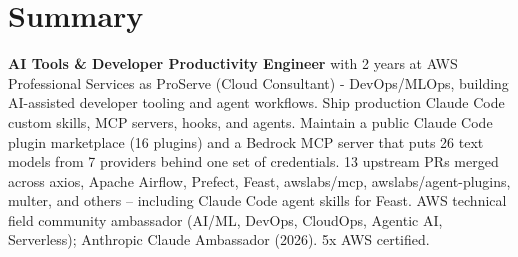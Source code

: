 \section{\textbf{Summary}}
\vspace{1pt}
\small{\textbf{AI Tools \& Developer Productivity Engineer} with 2 years at AWS Professional Services as ProServe (Cloud Consultant) - DevOps/MLOps, building AI-assisted developer tooling and agent workflows. Ship production Claude Code custom skills, MCP servers, hooks, and agents. Maintain a public Claude Code plugin marketplace (16 plugins) and a Bedrock MCP server that puts 26 text models from 7 providers behind one set of credentials. 13 upstream PRs merged across axios, Apache Airflow, Prefect, Feast, awslabs/mcp, awslabs/agent-plugins, multer, and others -- including Claude Code agent skills for Feast. AWS technical field community ambassador (AI/ML, DevOps, CloudOps, Agentic AI, Serverless); Anthropic Claude Ambassador (2026). 5x AWS certified.}
\vspace{-2mm}
